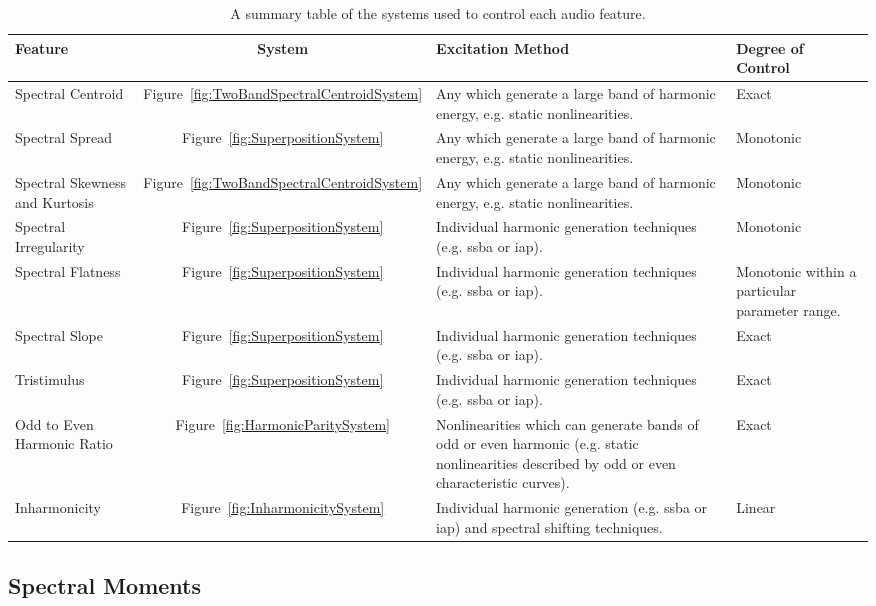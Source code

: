 		\begin{table}[h!]
			\centering
			\begin{tabular}{|C{3cm}|c|C{5cm}|C{3cm}|}
				\hline
				\bf{Feature} & \bf{System} & \bf{Excitation Method} & \bf{Degree of Control} 
				\tabularnewline
				\hline
				\hline
				Spectral Centroid & Figure~\ref{fig:TwoBandSpectralCentroidSystem} & 
				Any which generate a large band of harmonic energy, e.g. static nonlinearities. & 
				Exact \tabularnewline
				\hline
				Spectral Spread & Figure~\ref{fig:SuperpositionSystem} & 
				Any which generate a large band of harmonic energy, e.g. static nonlinearities. & 
				Monotonic \tabularnewline
				\hline
				Spectral Skewness and Kurtosis & Figure~\ref{fig:TwoBandSpectralCentroidSystem} & 
				Any which generate a large band of harmonic energy, e.g. static nonlinearities. & 
				Monotonic \tabularnewline
				\hline
				Spectral Irregularity & Figure~\ref{fig:SuperpositionSystem} & 
				Individual harmonic generation techniques (e.g. \acrshort{ssba} or \acrshort{iap}). & 
				Monotonic \tabularnewline
				\hline
				Spectral Flatness & Figure~\ref{fig:SuperpositionSystem} &
				Individual harmonic generation techniques (e.g. \acrshort{ssba} or \acrshort{iap}). & 
				Monotonic within a particular parameter range. \tabularnewline
				\hline
				Spectral Slope & Figure~\ref{fig:SuperpositionSystem} &
				Individual harmonic generation techniques (e.g. \acrshort{ssba} or \acrshort{iap}). & 
				Exact \tabularnewline
				\hline
				Tristimulus & Figure~\ref{fig:SuperpositionSystem} & 
				Individual harmonic generation techniques (e.g. \acrshort{ssba} or \acrshort{iap}). & 
				Exact \tabularnewline			
				\hline
				Odd to Even Harmonic Ratio & Figure~\ref{fig:HarmonicParitySystem} &
				Nonlinearities which can generate bands of odd or even harmonic 
				(e.g. static nonlinearities described by odd or even characteristic curves). & 
				Exact \tabularnewline
				\hline
				Inharmonicity & Figure~\ref{fig:InharmonicitySystem} & 
				Individual harmonic generation (e.g. \acrshort{ssba} or \acrshort{iap}) 
				and spectral shifting techniques. & Linear \tabularnewline
				\hline
			\end{tabular}
			\caption{A summary table of the systems used to control each audio feature.}
			\label{tab:FeatureControlSummary}
		\end{table}
	
	\newpage

	\subsection{Spectral Moments}
	\label{sec:FeatureControl-Parameterisation-SpectralMoments}
